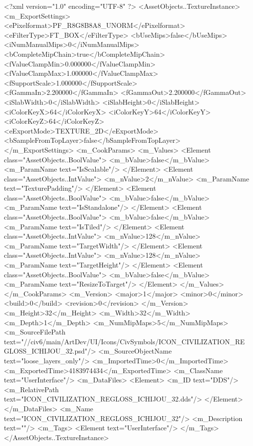 <?xml version="1.0" encoding="UTF-8" ?>
<AssetObjects..TextureInstance>
	<m_ExportSettings>
		<ePixelformat>PF_R8G8B8A8_UNORM</ePixelformat>
		<eFilterType>FT_BOX</eFilterType>
		<bUseMips>false</bUseMips>
		<iNumManualMips>0</iNumManualMips>
		<bCompleteMipChain>true</bCompleteMipChain>
		<fValueClampMin>0.000000</fValueClampMin>
		<fValueClampMax>1.000000</fValueClampMax>
		<fSupportScale>1.000000</fSupportScale>
		<fGammaIn>2.200000</fGammaIn>
		<fGammaOut>2.200000</fGammaOut>
		<iSlabWidth>0</iSlabWidth>
		<iSlabHeight>0</iSlabHeight>
		<iColorKeyX>64</iColorKeyX>
		<iColorKeyY>64</iColorKeyY>
		<iColorKeyZ>64</iColorKeyZ>
		<eExportMode>TEXTURE_2D</eExportMode>
		<bSampleFromTopLayer>false</bSampleFromTopLayer>
	</m_ExportSettings>
	<m_CookParams>
		<m_Values>
			<Element class="AssetObjects..BoolValue">
				<m_bValue>false</m_bValue>
				<m_ParamName text="IsScalable"/>
			</Element>
			<Element class="AssetObjects..IntValue">
				<m_nValue>2</m_nValue>
				<m_ParamName text="TexturePadding"/>
			</Element>
			<Element class="AssetObjects..BoolValue">
				<m_bValue>false</m_bValue>
				<m_ParamName text="IsStandalone"/>
			</Element>
			<Element class="AssetObjects..BoolValue">
				<m_bValue>false</m_bValue>
				<m_ParamName text="IsTiled"/>
			</Element>
			<Element class="AssetObjects..IntValue">
				<m_nValue>128</m_nValue>
				<m_ParamName text="TargetWidth"/>
			</Element>
			<Element class="AssetObjects..IntValue">
				<m_nValue>128</m_nValue>
				<m_ParamName text="TargetHeight"/>
			</Element>
			<Element class="AssetObjects..BoolValue">
				<m_bValue>false</m_bValue>
				<m_ParamName text="ResizeToTarget"/>
			</Element>
		</m_Values>
	</m_CookParams>
	<m_Version>
		<major>1</major>
		<minor>0</minor>
		<build>0</build>
		<revision>0</revision>
	</m_Version>
	<m_Height>32</m_Height>
	<m_Width>32</m_Width>
	<m_Depth>1</m_Depth>
	<m_NumMipMaps>5</m_NumMipMaps>
	<m_SourceFilePath text="//civ6/main/ArtDev/UI/Icons/CivSymbols/ICON_CIVILIZATION_REGLOSS_ICHIJOU_32.psd"/>
	<m_SourceObjectName text="loose_layers_only"/>
	<m_ImportedTime>0</m_ImportedTime>
	<m_ExportedTime>4183974434</m_ExportedTime>
	<m_ClassName text="UserInterface"/>
	<m_DataFiles>
		<Element>
			<m_ID text="DDS"/>
			<m_RelativePath text="ICON_CIVILIZATION_REGLOSS_ICHIJOU_32.dds"/>
		</Element>
	</m_DataFiles>
	<m_Name text="ICON_CIVILIZATION_REGLOSS_ICHIJOU_32"/>
	<m_Description text=""/>
	<m_Tags>
		<Element text="UserInterface"/>
	</m_Tags>
</AssetObjects..TextureInstance>

